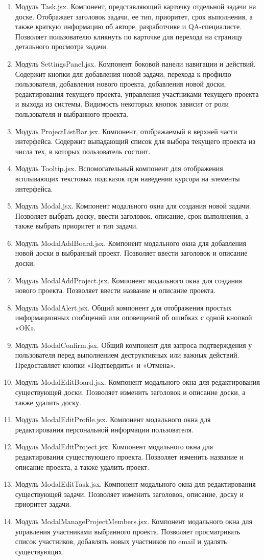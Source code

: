 \begin{enumerate}
	\item Модуль Task.jsx. Компонент, представляющий карточку отдельной задачи на доске. Отображает заголовок задачи, ее тип, приоритет, срок выполнения, а также краткую информацию об авторе, разработчике и QA-специалисте. Позволяет пользователю кликнуть по карточке для перехода на страницу детального просмотра задачи.
	\item Модуль SettingsPanel.jsx. Компонент боковой панели навигации и действий. Содержит кнопки для добавления новой задачи, перехода к профилю пользователя, добавления нового проекта, добавления новой доски, редактирования текущего проекта, управления участниками текущего проекта и выхода из системы. Видимость некоторых кнопок зависит от роли пользователя и выбранного проекта.
	\item Модуль ProjectListBar.jsx. Компонент, отображаемый в верхней части интерфейса. Содержит выпадающий список для выбора текущего проекта из числа тех, в которых пользователь состоит.
	\item Модуль Tooltip.jsx. Вспомогательный компонент для отображения всплывающих текстовых подсказок при наведении курсора на элементы интерфейса.
	\item Модуль Modal.jsx. Компонент модального окна для создания новой задачи. Позволяет выбрать доску, ввести заголовок, описание, срок выполнения, а также выбрать приоритет и тип задачи.
	\item Модуль ModalAddBoard.jsx. Компонент модального окна для добавления новой доски в выбранный проект. Позволяет ввести заголовок и описание доски.
	\item Модуль ModalAddProject.jsx. Компонент модального окна для создания нового проекта. Позволяет ввести название и описание проекта.
	\item Модуль ModalAlert.jsx. Общий компонент для отображения простых информационных сообщений или оповещений об ошибках с одной кнопкой «OK».
	\item Модуль ModalConfirm.jsx. Общий компонент для запроса подтверждения у пользователя перед выполнением деструктивных или важных действий. Предоставляет кнопки «Подтвердить» и «Отмена».
	\item Модуль ModalEditBoard.jsx. Компонент модального окна для редактирования существующей доски. Позволяет изменить заголовок и описание доски, а также удалить доску.
	\item Модуль ModalEditProfile.jsx. Компонент модального окна для редактирования персональной информации пользователя.
	\item Модуль ModalEditProject.jsx. Компонент модального окна для редактирования существующего проекта. Позволяет изменить название и описание проекта, а также удалить проект.
	\item Модуль ModalEditTask.jsx. Компонент модального окна для редактирования существующей задачи. Позволяет изменить заголовок, описание, доску и приоритет задачи.
	\item Модуль ModalManageProjectMembers.jsx. Компонент модального окна для управления участниками выбранного проекта. Позволяет просматривать список участников, добавлять новых участников по email и удалять существующих.
\end{enumerate}

